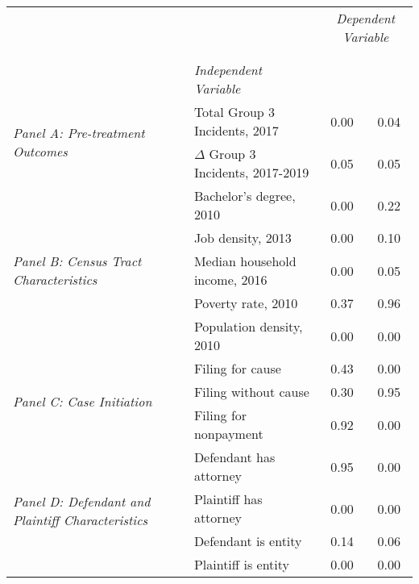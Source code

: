 \begin{tabular}{llcc}
\toprule
 &  & \multicolumn{2}{c}{\textit{Dependent Variable}} \\
\cline{3-4}
\\
 &  &  &  \\
 & \emph{Independent Variable} &  &  \\
\midrule
\multirow[c]{2}{3cm}{\textit{Panel A: Pre-treatment Outcomes}} & Total Group 3 Incidents, 2017 & 0.00 & 0.04 \\
 & $\Delta$ Group 3 Incidents, 2017-2019 & 0.05 & 0.05 \\
\cline{1-4}
\multirow[c]{5}{3cm}{\textit{Panel B: Census Tract Characteristics}} & Bachelor's degree, 2010 & 0.00 & 0.22 \\
 & Job density, 2013 & 0.00 & 0.10 \\
 & Median household income, 2016 & 0.00 & 0.05 \\
 & Poverty rate, 2010 & 0.37 & 0.96 \\
 & Population density, 2010 & 0.00 & 0.00 \\
\cline{1-4}
\multirow[c]{3}{3cm}{\textit{Panel C: Case Initiation}} & Filing for cause & 0.43 & 0.00 \\
 & Filing without cause & 0.30 & 0.95 \\
 & Filing for nonpayment & 0.92 & 0.00 \\
\cline{1-4}
\multirow[c]{4}{3cm}{\textit{Panel D: Defendant and Plaintiff Characteristics}} & Defendant has attorney & 0.95 & 0.00 \\
 & Plaintiff has attorney & 0.00 & 0.00 \\
 & Defendant is entity & 0.14 & 0.06 \\
 & Plaintiff is entity & 0.00 & 0.00 \\
\cline{1-4}
\bottomrule
\end{tabular}
